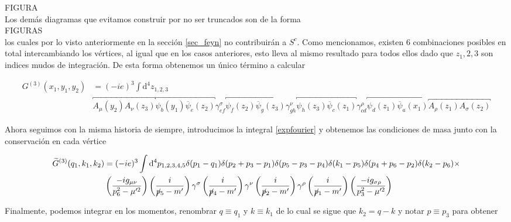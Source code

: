 \documentclass{article}
\numberwithin{equation}{section}
\begin{document}
FIGURA\\

Los demás diagramas que evitamos construir por no ser truncados son de la forma\\

FIGURAS\\

los cuales por lo visto anteriormente en la sección \ref{sec_feyn} no contribuirán a $ S^c $.
Como mencionamos, existen 6 combinaciones posibles en total intercambiando los vértices, al igual que en los casos anteriores, esto lleva al mismo resultado para todos ellos dado que $ z_1,2,3 $ son indices mudos de integración. De esta forma obtenemos un único término a calcular 

\begin{equation}\label{key}
\begin{aligned}
G^{(3)}(x_1,y_1,y_2)&=(-ie)^3\int \mathrm{d^4}z_{1,2,3}\\
& \overbracket{A_{\mu}(y_2)A_{\nu}(z_3)} \overbracket{\psi_b(y_1) \overline{\psi}_e(z_2)} \gamma^{\sigma}_{ef} \overbracket{\psi_f(z_2) \overline{\psi}_g(z_3)} \gamma^{\nu}_{gh} \overbracket{\psi_h(z_3) \overline{\psi}_c(z_1)} \gamma^{\rho}_{cd} \overbracket{\psi_d(z_1) \overline{\psi}_a(x_1)} \overbracket{ A_{\rho}(z_1)A_{\sigma}(z_2)}
\end{aligned}
\end{equation} 

Ahora seguimos con la misma historia de siempre, introducimos la integral \ref{expfourier} y obtenemos las condiciones de masa junto con la conservación en cada vértice

\begin{equation}\label{key}
\begin{aligned}
\widetilde{G}^{(3)}(q_1,k_1,k_2)&=(-ie)^3\int \mathrm{d^4}p_{1,2,3,4,5} \delta(p_1-q_1)\delta(p_2+p_3-p_1)\delta(p_5-p_3-p_4)\delta(k_1-p_5)\delta(p_4+p_6-p_2)\delta(k_2-p_6) \times\\
&\left(\frac{-ig_{\mu\nu}}{p_6^2-\mu'^2}\right)\left(\frac{i}{\cancel{p}_5-m'}\right)\gamma^{\sigma}\left(\frac{i}{\cancel{p}_4-m'}\right)\gamma^{\nu}\left(\frac{i}{\cancel{p}_2-m'}\right)\gamma^{\rho}\left(\frac{i}{\cancel{p}_1-m'}\right)\left(\frac{-ig_{\sigma\rho}}{p_3^2-\mu'^2}\right)
\end{aligned}
\end{equation}
 
Finalmente, podemos integrar en los momentos, renombrar $ q\equiv q_1 $ y $ k \equiv k_1 $ de lo cual se sigue que $ k_2 =q-k $
y notar $ p\equiv p_3 $ para obtener
\end{document}
